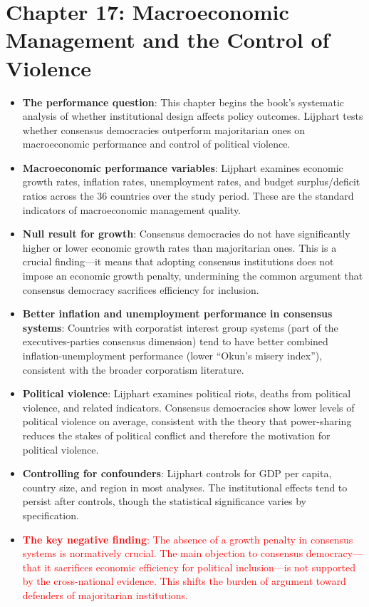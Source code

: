 \documentclass[12pt]{article}
\begin{document}
\section{Chapter 17: Macroeconomic Management and the Control of Violence}

\begin{itemize}[leftmargin=*, itemsep=4pt]
    \item \textbf{The performance question}: This chapter begins the book's systematic analysis of whether institutional design affects policy outcomes. Lijphart tests whether consensus democracies outperform majoritarian ones on macroeconomic performance and control of political violence.
    \item \textbf{Macroeconomic performance variables}: Lijphart examines economic growth rates, inflation rates, unemployment rates, and budget surplus/deficit ratios across the 36 countries over the study period. These are the standard indicators of macroeconomic management quality.
    \item \textbf{Null result for growth}: Consensus democracies do not have significantly higher or lower economic growth rates than majoritarian ones. This is a crucial finding---it means that adopting consensus institutions does not impose an economic growth penalty, undermining the common argument that consensus democracy sacrifices efficiency for inclusion.
    \item \textbf{Better inflation and unemployment performance in consensus systems}: Countries with corporatist interest group systems (part of the executives-parties consensus dimension) tend to have better combined inflation-unemployment performance (lower ``Okun's misery index''), consistent with the broader corporatism literature.
    \item \textbf{Political violence}: Lijphart examines political riots, deaths from political violence, and related indicators. Consensus democracies show lower levels of political violence on average, consistent with the theory that power-sharing reduces the stakes of political conflict and therefore the motivation for political violence.
    \item \textbf{Controlling for confounders}: Lijphart controls for GDP per capita, country size, and region in most analyses. The institutional effects tend to persist after controls, though the statistical significance varies by specification.
    \item \textcolor{red}{\textbf{The key negative finding}: The absence of a growth penalty in consensus systems is normatively crucial. The main objection to consensus democracy---that it sacrifices economic efficiency for political inclusion---is not supported by the cross-national evidence. This shifts the burden of argument toward defenders of majoritarian institutions.}
\end{itemize}
\end{document}
